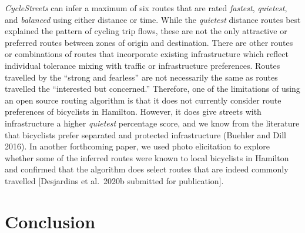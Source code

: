 \documentclass[smallextended]{svjour3}       %
\begin{document}
\emph{CycleStreets} can infer a maximum of six routes that are rated
\emph{fastest}, \emph{quietest}, and \emph{balanced} using either
distance or time. While the \emph{quietest} distance routes best
explained the pattern of cycling trip flows, these are not the only
attractive or preferred routes between zones of origin and destination.
There are other routes or combinations of routes that incorporate
existing infrastructure which reflect individual tolerance mixing with
traffic or infrastructure preferences. Routes travelled by the ``strong
and fearless'' are not necessarily the same as routes travelled the
``interested but concerned.'' Therefore, one of the limitations of using
an open source routing algorithm is that it does not currently consider
route preferences of bicyclists in Hamilton. However, it does give
streets with infrastructure a higher \emph{quietest} percentage score,
and we know from the literature that bicyclists prefer separated and
protected infrastructure (Buehler and Dill 2016). In another forthcoming
paper, we used photo elicitation to explore whether some of the inferred
routes were known to local bicyclists in Hamilton and confirmed that the
algorithm does select routes that are indeed commonly travelled
{[}Desjardins et al.~2020b submitted for publication{]}.

\hypertarget{sec:conclusion}{%
\section{Conclusion}\label{sec:conclusion}}
\end{document}
